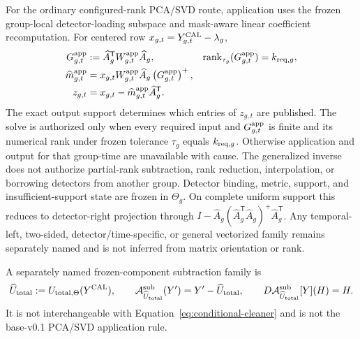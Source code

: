 For the ordinary configured-rank PCA/SVD route, application uses the frozen
group-local detector-loading subspace and mask-aware linear coefficient
recomputation. For centered row
$x_{g,t}=Y^{\rm CAL}_{g,t}-\lambda_g$,
\begin{equation}
\begin{aligned}
G^{\rm app}_{g,t}
&:=\widehat A_g^{\mathsf T}W^{\rm app}_{g,t}\widehat A_g,
&\operatorname{rank}_{\tau_g}(G^{\rm app}_{g,t})
&=k_{{\rm req},g},\\
\widehat m^{\rm app}_{g,t}
&=x_{g,t}W^{\rm app}_{g,t}\widehat A_g
  \left(G^{\rm app}_{g,t}\right)^+,\\
z_{g,t}
&=x_{g,t}-\widehat m^{\rm app}_{g,t}\widehat A_g^{\mathsf T}.
\end{aligned}
\label{eq:conditional-cleaner}
\end{equation}
The exact output support determines which entries of $z_{g,t}$ are published.
The solve is authorized only when every required input and
$G^{\rm app}_{g,t}$ is finite and its numerical rank under frozen tolerance
$\tau_g$ equals $k_{{\rm req},g}$. Otherwise application and output for that
group-time are unavailable with cause. The generalized inverse does not
authorize partial-rank subtraction, rank reduction, interpolation, or
borrowing detectors from another group. Detector binding, metric, support,
and insufficient-support state are frozen in $\Theta_g$. On complete uniform
support this reduces to detector-right projection through
$I-\widehat A_g(\widehat A_g^{\mathsf T}\widehat A_g)^+
\widehat A_g^{\mathsf T}$. Any temporal-left, two-sided,
detector/time-specific, or general vectorized family remains separately named
and is not inferred from matrix orientation or rank.

A separately named frozen-component subtraction family is
\begin{equation}
\widehat U_{\rm total}:=U_{{\rm total},\Theta}(Y^{\rm CAL}),
\qquad
\mathcal A^{\rm sub}_{\widehat U_{\rm total}}(Y')=Y'-\widehat U_{\rm total},
\qquad
D\mathcal A^{\rm sub}_{\widehat U_{\rm total}}[Y](H)=H.
\label{eq:frozen-component}
\end{equation}
It is not interchangeable with Equation~\ref{eq:conditional-cleaner} and is
not the base-v0.1 PCA/SVD application rule.
